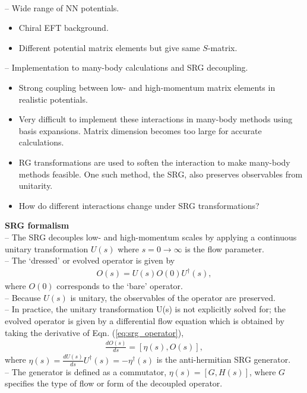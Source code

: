 \documentclass[preprintnumbers,floatfix,aps,prc,preprint,nofootinbib]{revtex4-1}
\begin{document}
\\
-- Wide range of NN potentials.
%
\begin{itemize}
	\item Chiral EFT background.
	\item Different potential matrix elements but give same $S$-matrix.
\end{itemize}
%
-- Implementation to many-body calculations and SRG decoupling.
%
\begin{itemize}
	\item Strong coupling between low- and high-momentum matrix elements in realistic potentials.
	\item Very difficult to implement these interactions in many-body methods using basis expansions. Matrix dimension becomes too large for accurate calculations.
	\item RG transformations are used to soften the interaction to make many-body methods feasible. One such method, the SRG, also preserves observables from unitarity.
	\item How do different interactions change under SRG transformations?
\end{itemize}
%
\textbf{SRG formalism}
\\
-- The SRG decouples low- and high-momentum scales by applying a continuous unitary transformation $U(s)$ where $s=0 \rightarrow \infty$ is the flow parameter.
\\
-- The `dressed' or evolved operator is given by
%
\begin{eqnarray}
	\label{eq:srg_operator}
	O(s) = U(s) O(0) U^{\dagger}(s),
\end{eqnarray}
%
where $O(0)$ corresponds to the `bare' operator.
\\
-- Because $U(s)$ is unitary, the observables of the operator are preserved.
\\
-- In practice, the unitary transformation U(s) is not explicitly solved for; the evolved operator is given by a differential flow equation which is obtained by taking the derivative of Eqn. (\ref{eq:srg_operator}),
%
\begin{eqnarray}
	\label{eq:srg_flow}
	\frac{dO(s)}{ds} = [\eta(s), O(s)],
\end{eqnarray}
%
where $\eta(s)=\frac{dU(s)}{ds} U^{\dagger}(s) = -\eta^{\dagger}(s)$ is the anti-hermitian SRG generator.
\\
-- The generator is defined as a commutator, $\eta(s) = [G, H(s)]$, where $G$ specifies the type of flow or form of the decoupled operator.
\end{document}
